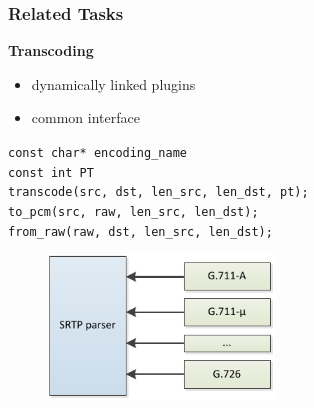 \documentclass[10pt, xcolor=pdflatex, dvipsnames, table]{beamer}
\begin{document}

\begin{frame}
\frametitle{Related Tasks}
\textbf{Transcoding}
\begin{itemize}
\item dynamically linked plugins
\item common interface
\end{itemize}
\texttt{const char* encoding\_name}\\
\texttt{const int PT}\\
\texttt{transcode(src, dst, len\_src, len\_dst, pt);}\\
\texttt{to\_pcm(src, raw, len\_src, len\_dst);}\\
\texttt{from\_raw(raw, dst, len\_src, len\_dst);}\\

\begin{figure}[H]
\centering
\includegraphics[width=6cm,keepaspectratio]{img/plugins.pdf}
\end{figure}
\end{frame}
\end{document}
